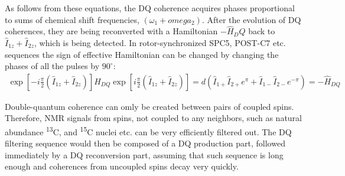 \documentclass[a4paper, 12pt]{article}
\begin{document}
As follows from these equations, the DQ coherence acquires phases proportional to sums of chemical shift frequencies, $(\omega_1 + omega_2)$. After the evolution of DQ coherences, they are being reconverted with a Hamiltonian $-\hat{H}_DQ$ back to $\hat{I}_{1z} + \hat{I}_{2z}$, which is being detected. In rotor-synchronized SPC5, POST-C7 etc. sequences the sign of effective Hamiltonian can be changed by changing the phases of all the pulses by $90 ^\circ$:
\begin{eqnarray}
\exp [-i \frac{\pi}{2} (\hat{I}_{1z}+\hat{I}_{2z})] \hat{H}_{DQ} \exp [i \frac{\pi}{2} (\hat{I}_{1z}+\hat{I}_{2z})]= d (\hat{I}_{1+} \hat{I}_{2+} e^{\pi}+ \hat{I}_{1-} \hat{I}_{2-} e^{-\pi}) = -\hat{H}_{DQ}
\end{eqnarray}

Double-quantum coherence can omly be created  between pairs of coupled spins. Therefore, NMR signals from spins, not coupled to any neighbors, such as natural abundance  \textsuperscript{13}C, and \textsuperscript{15}C nuclei etc. can be very efficiently filtered out. 
The DQ filtering sequence would then be composed of a DQ production part, followed immediately by a DQ reconversion part, assuming that such sequence is long enough and coherences from uncoupled spins decay very quickly. 





\end{document}
